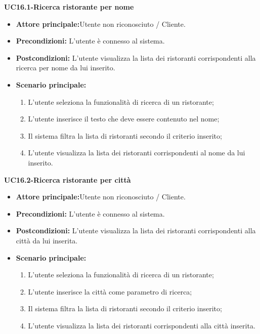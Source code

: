 \pagebreak
\textbf{UC16.1-Ricerca ristorante per nome}
\begin{itemize}
\item \textbf{Attore principale:}Utente non riconosciuto / Cliente.
\item \textbf{Precondizioni:} L'utente è connesso al sistema.
\item \textbf{Postcondizioni:} L'utente visualizza la lista dei ristoranti corrispondenti
alla ricerca per nome da lui inserito.
\item \textbf{Scenario principale:}
\begin{enumerate}
    \item L'utente seleziona la funzionalità di ricerca di un ristorante;
    \item L'utente inserisce il testo che deve essere contenuto nel nome;
    \item Il sistema filtra la lista di ristoranti secondo il criterio inserito;
    \item L'utente visualizza la lista dei ristoranti corrispondenti al nome da lui inserito.
\end{enumerate}
\end{itemize}

\textbf{UC16.2-Ricerca ristorante per città}
\begin{itemize}
\item \textbf{Attore principale:}Utente non riconosciuto / Cliente.
\item \textbf{Precondizioni:} L'utente è connesso al sistema.
\item \textbf{Postcondizioni:} L'utente visualizza la lista dei ristoranti corrispondenti alla città da lui inserita.
\item \textbf{Scenario principale:}
\begin{enumerate}
    \item L'utente seleziona la funzionalità di ricerca di un ristorante;
    \item L'utente inserisce la città come parametro di ricerca;
    \item Il sistema filtra la lista di ristoranti secondo il criterio inserito;
    \item L'utente visualizza la lista dei ristoranti corrispondenti alla città inserita.
\end{enumerate}
\end{itemize}

